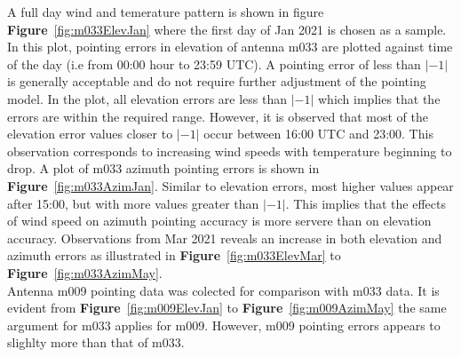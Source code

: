 \documentclass{article}
\begin{document}
A full day wind and temerature pattern is shown in figure \textbf{Figure}~\ref{fig:m033ElevJan} where the first day of Jan 2021 is chosen as a sample.  In this plot, pointing errors in elevation of antenna m033 are plotted against time of the day (i.e from 00:00 hour to 23:59 UTC).  A pointing error of  less than $|-1|$ is generally acceptable and do not require further adjustment of the pointing model.  In the plot, all elevation errors are less than $|-1|$ which implies that the errors are within the required range.  However, it is observed that most of the elevation error values closer to $|-1|$ occur between 16:00 UTC and 23:00.  This observation corresponds to increasing wind speeds with temperature beginning to drop.  A plot of m033 azimuth pointing errors is shown in \textbf{Figure}~\ref{fig:m033AzimJan}.  Similar to elevation errors, most higher values appear after 15:00, but with more values greater than $|-1|$. This implies that the effects of wind speed on azimuth pointing accuracy is more servere than on elevation accuracy.  Observations from Mar 2021 reveals an increase in both elevation and azimuth errors as illustrated in \textbf{Figure}~\ref{fig:m033ElevMar} to \textbf{Figure}~\ref{fig:m033AzimMay}.   \\


Antenna m009 pointing data was colected for comparison with m033 data.  It is evident from \textbf{Figure}~\ref{fig:m009ElevJan} to \textbf{Figure}~\ref{fig:m009AzimMay} the same argument for m033 applies for m009.  However, m009 pointing errors appears to slighlty more than that of m033.  \\
\end{document}
